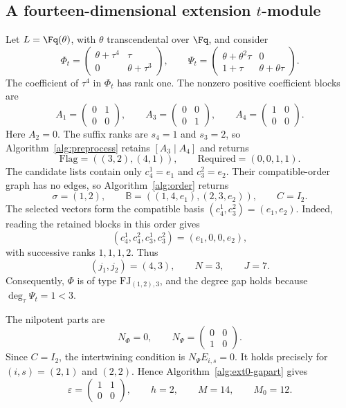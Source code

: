 \subsection{A fourteen-dimensional extension \texorpdfstring{$t$}{t}-module}
\label{sec:large-example}
\setcounter{MaxMatrixCols}{14}

Let $L=\Fq(\theta)$, with $\theta$ transcendental over $\Fq$,
and consider
\begin{equation}
 \Phi_t=
 \begin{pmatrix}
  \theta+\tau^4&\tau\\
  0&\theta+\tau^3
 \end{pmatrix},
 \qquad
 \Psi_t=
 \begin{pmatrix}
  \theta+\theta^2\tau&0\\
  1+\tau&\theta+\theta\tau
 \end{pmatrix}.
 \label{eq:large-presentations}
\end{equation}
The coefficient of $\tau^4$ in $\Phi_t$ has rank one.
The nonzero positive coefficient blocks are
\[
 A_1=\begin{pmatrix}0&1\\0&0\end{pmatrix},\qquad
 A_3=\begin{pmatrix}0&0\\0&1\end{pmatrix},\qquad
 A_4=\begin{pmatrix}1&0\\0&0\end{pmatrix}.
\]
Here $A_2=0$. The suffix ranks are $s_4=1$ and $s_3=2$,
so Algorithm~\ref{alg:preprocess} retains $[A_3\mid A_4]$
and returns
\[
 \mathrm{Flag}=((3,2),(4,1)),\qquad
 \mathrm{Required}=(0,0,1,1).
\]
The candidate lists contain only $c_4^1=e_1$ and
$c_3^2=e_2$. Their compatible-order graph has no edges,
so Algorithm~\ref{alg:order} returns
\begin{equation}
 \sigma=(1,2),\qquad
 \mathbb B=((1,4,e_1),(2,3,e_2)),\qquad C=I_2.
 \label{eq:large-compatible-basis}
\end{equation}
The selected vectors form the compatible basis
$(c_4^1,c_3^2)=(e_1,e_2)$.
Indeed, reading the retained blocks in this order gives
\[
 (c_4^1,c_4^2,c_3^1,c_3^2)=(e_1,0,0,e_2),
\]
with successive ranks $1,1,1,2$. Thus
\[
 (j_1,j_2)=(4,3),\qquad N=3,\qquad J=7.
\]
Consequently, $\Phi$ is of type $\mathrm{FJ}_{(1,2),3}$,
and the degree gap holds because $\deg_\tau\Psi_t=1<3$.

The nilpotent parts are
\[
 N_\Phi=0,\qquad
 N_\Psi=\begin{pmatrix}0&0\\1&0\end{pmatrix}.
\]
Since $C=I_2$, the intertwining condition is
$N_\Psi E_{i,s}=0$. It holds precisely for $(i,s)=(2,1)$
and $(2,2)$. Hence Algorithm~\ref{alg:ext0-gapart} gives
\begin{equation}
 \varepsilon=\begin{pmatrix}1&1\\0&0\end{pmatrix},
 \qquad h=2,\qquad M=14,\qquad M_0=12.
 \label{eq:large-dimensions}
\end{equation}

